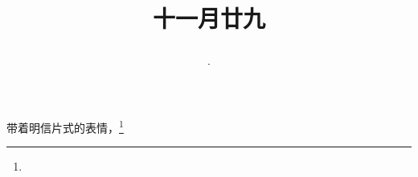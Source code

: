 \title{\date[d=10,m=1,y=2024][year:cn-y,年,month:cn,day:cn,日,·,weekday]·十一月廿九 }
带着明信片式的表情，\footnote{ }

